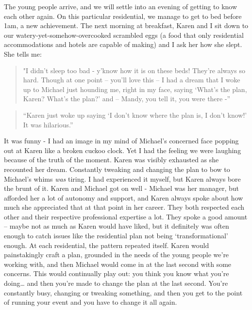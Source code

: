 The young people arrive, and we will settle into an evening of getting to know each other again. On this particular residential, we manage to get to bed before 1am, a new achievement. The next morning at breakfast, Karen and I sit down to our watery-yet-somehow-overcooked scrambled eggs (a food that only residential accommodations and hotels are capable of making) and I ask her how she slept. She tells me:

\begin{quote}
"I didn’t sleep too bad - y’know how it is on these beds! They’re always so hard. Though at one point – you’ll love this – I had a dream that I woke up  to Michael just hounding me, right in my face, saying ‘What’s the plan, Karen? What’s the plan?’ and – Mandy, you tell it, you were there -”
\end{quote}
\begin{quote}
    
“Karen just woke up saying ‘I don’t know where the plan is, I don’t know!’ It was hilarious.”

\end{quote}
It was funny - I had an image in my mind of Michael’s concerned face popping out at Karen like a broken cuckoo clock. Yet I had the feeling we were laughing because of the truth of the moment. Karen was visibly exhausted as she recounted her dream. Constantly tweaking and changing the plan to bow to Michael’s whims \emph{was} tiring. I had experienced it myself, but Karen always bore the brunt of it. Karen and Michael got on well - Michael was her manager, but afforded her a lot of autonomy and support, and Karen always spoke about how much she appreciated that at that point in her career. They both respected each other and their respective professional expertise a lot. They spoke a good amount – maybe not as much as Karen would have liked, but it definitely was often enough to catch issues like the residential plan not being `transformational' enough. At each residential, the pattern repeated itself. Karen would painstakingly craft a plan, grounded in the needs of the young people we’re working with, and then Michael would come in at the last second with some concerns. This would continually play out: you think you know what you’re doing… and then you’re made to change the plan at the last second. You’re constantly busy, changing or tweaking something, and then you get to the point of running your event and you have to change it all again. 

